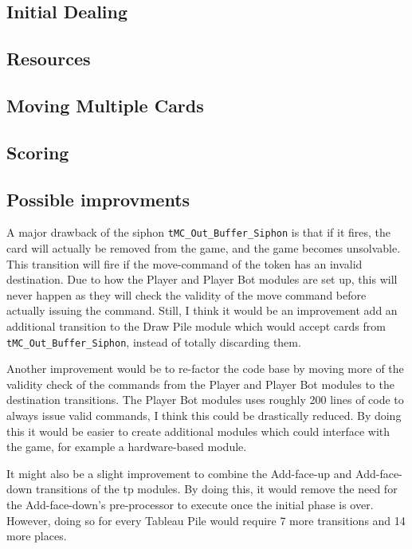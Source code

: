 \documentclass[runningheads,a4paper]{llncs}
\begin{document}
\subsection{Initial Dealing}
\subsection{Resources}
\label{sec:3_Resources}
\subsection{Moving Multiple Cards}
\subsection{Scoring}
\subsection{Possible improvments}
A major drawback of the siphon \verb!tMC_Out_Buffer_Siphon! is that if it fires, the card will actually be removed from the game, and the game becomes unsolvable. This transition will fire if the move-command of the token has an invalid destination. Due to how the Player and Player Bot modules are set up, this will never happen as they will check the validity of the move command before actually issuing the command. Still, I think it would be an improvement add an additional transition to the Draw Pile module which would accept cards from \verb!tMC_Out_Buffer_Siphon!, instead of totally discarding them.
\newline

Another improvement would be to re-factor the code base by moving more of the validity check of the commands from the Player and Player Bot modules to the destination transitions. The Player Bot modules uses roughly 200 lines of code to always issue valid commands, I think this could be drastically reduced. By doing this it would be easier to create additional modules which could interface with the game, for example a hardware-based module.
\newline

It might also be a slight improvement to combine the Add-face-up and Add-face-down transitions of the \ac{tp} modules. By doing this, it would remove the need for the Add-face-down's pre-processor to execute once the initial phase is over. However, doing so for every Tableau Pile would require 7 more transitions and 14 more places. \\
\end{document}
